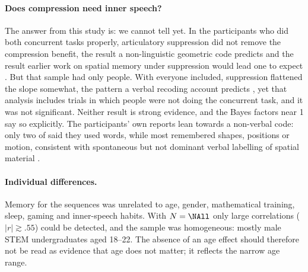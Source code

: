 \documentclass[11pt,a4paper]{article}
\begin{document}
\paragraph{Does compression need inner speech?} The answer from this study is: we cannot tell yet. In the participants who
did both concurrent tasks properly, articulatory suppression did not remove the compression benefit, the result a
non-linguistic geometric code predicts \citep{dehaene2022symbols,fedorenko2024language} and the result earlier work on
spatial memory under suppression would lead one to expect \citep{vandierendonck2004working,rossiarnaud2006symmetry}. But that
sample had only \NFinal{} people. With everyone included, suppression flattened the slope somewhat, the pattern a verbal
recoding account predicts \citep{lupyan2012linguistically}, yet that analysis includes trials in which people were not
doing the concurrent task, and it was not significant. Neither result is strong evidence, and the Bayes factors near 1 say
so explicitly. The participants' own reports lean towards a non-verbal code: only two of \NAll{} said they used words, while
most remembered shapes, positions or motion, consistent with spontaneous but not dominant verbal labelling of spatial material
\citep{seabra2025verbal}.

\paragraph{Individual differences.} Memory for the sequences was unrelated to age, gender, mathematical training, sleep,
gaming and inner-speech habits. With $N = \NAll$ only large correlations ($|r| \gtrsim .55$) could be detected, and the
sample was homogeneous: mostly male STEM undergraduates aged 18--22. The absence of an age effect should therefore not
be read as evidence that age does not matter; it reflects the narrow age range.
\end{document}
